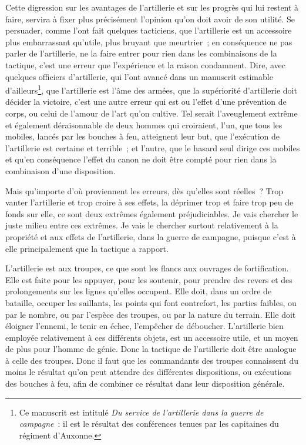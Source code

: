 \documentclass[french,twoside]{book} %
\begin{document}
Cette digression sur les avantages de l’artillerie et sur les progrès qui lui restent à faire, servira à fixer plus précisément l’opinion qu’on doit avoir de son utilité. Se persuader, comme l’ont fait quelques tacticiens, que l’artillerie est un accessoire plus embarrassant qu’utile, plus bruyant que meurtrier ; en conséquence ne pas parler de l’artillerie, ne la faire entrer pour rien dans les combinaisons de la tactique, c’est une erreur que l’expérience et la raison condamnent. Dire, avec quelques officiers d’artillerie, qui l’ont avancé dans un manuscrit estimable d’ailleurs\footnote{Ce manuscrit est intitulé {\itshape Du service de l’artillerie dans la guerre de campagne} : il est le résultat des conférences tenues par les capitaines du régiment d’Auxonne.}, que l’artillerie est l’âme des armées, que la supériorité d’artillerie doit décider la victoire, c’est une autre erreur qui est ou l’effet d’une prévention de corps, ou celui de l’amour de l’art qu’on cultive. Tel serait l’aveuglement extrême et également déraisonnable de deux hommes qui croiraient, l’un, que tous les mobiles, lancés par les bouches à feu, atteignent leur but, que l’exécution de l’artillerie est certaine et terrible ; et l’autre, que le hasard seul dirige ces mobiles et qu’en conséquence l’effet du canon ne doit être compté pour rien dans la combinaison d’une disposition.\par
Mais qu’importe d’où proviennent les erreurs, dès qu’elles sont réelles ? Trop vanter l’artillerie et trop croire à ses effets, la déprimer trop et faire trop peu de fonds sur elle, ce sont deux extrêmes également préjudiciables. Je vais chercher le juste milieu entre ces extrêmes. Je vais le chercher surtout relativement à la propriété et aux effets de l’artillerie, dans la guerre de campagne, puisque c’est à elle principalement que la tactique a rapport.\par
L’artillerie est aux troupes, ce que sont les flancs aux ouvrages de fortification. Elle est faite pour les appuyer, pour les soutenir, pour prendre des revers et des prolongements sur les lignes qu’elles occupent. Elle doit, dans un ordre de bataille, occuper les saillants, les points qui font contrefort, les parties faibles, ou par le nombre, ou par l’espèce des troupes, ou par la nature du terrain. Elle doit éloigner l’ennemi, le tenir en échec, l’empêcher de déboucher. L’artillerie bien employée relativement à ces différents objets, est un accessoire utile, et un moyen de plus pour l’homme de génie. Donc la tactique de l’artillerie doit être analogue à celle des troupes. Donc il faut que les commandants des troupes connaissent du moins le résultat qu’on peut attendre des différentes dispositions, ou exécutions des bouches à feu, afin de combiner ce résultat dans leur disposition générale.\par
\end{document}

